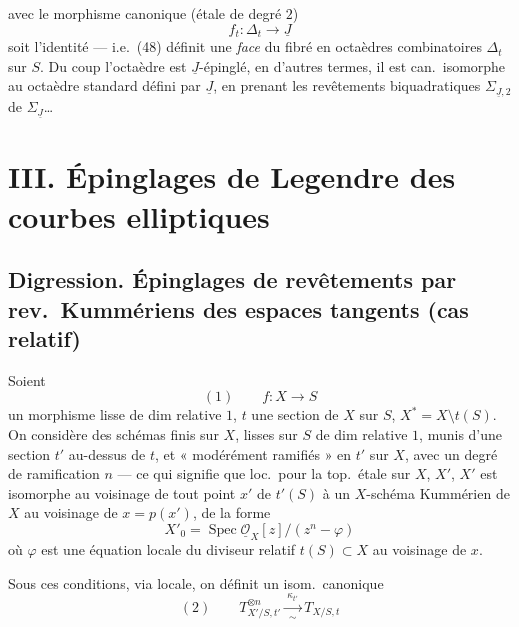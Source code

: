\documentclass[11pt,a4paper]{article}
\begin{document}
avec le morphisme canonique (étale de degré $2$)
\[
  f_t : \Delta_t \longrightarrow \underline{J}
\]
soit l'identité --- i.e.\ (48) définit une \emph{face} du fibré en
octaèdres combinatoires $\Delta_t$ sur $S$. Du coup l'octaèdre est
$\underline{J}$-épinglé, en d'autres termes, il est can.\ isomorphe au
\struck{\ill{}} octaèdre standard défini par $\underline{J}$,  en prenant les revêtements biquadratiques
$\Sigma_{\underline{J},2}$ de $\Sigma_{\underline{J}}$\ldots
{}

\section{III. Épinglages de Legendre des courbes elliptiques}

\subsection{Digression. Épinglages de revêtements par rev.\ Kummériens des espaces tangents (cas relatif)}

Soient
\[
  (1) \qquad f : X \longrightarrow S
\]
un morphisme lisse de dim relative $1$, $t$ une section de $X$ sur $S$,
$X^* = X \setminus t(S)$. On considère des schémas  finis sur
 $X$, lisses sur $S$ de dim relative $1$, munis d'une section
$t'$ au-dessus de $t$, et « modérément ramifiés » en $t'$ sur $X$, avec un
degré de ramification $n$ --- ce qui signifie que loc.\ pour la top.\ étale
sur $X$, $X'$, $X'$ est isomorphe au voisinage de tout point $x'$ de
$t'(S)$  à un $X$-schéma Kummérien de $X$ au voisinage de
$x = p(x')$, de la forme
\[
  X'_0 = \operatorname{Spec} \underline{\mathcal{O}}_X[z]/(z^n - \varphi)
\]
où $\varphi$ est une équation locale du diviseur relatif $t(S) \subset X$ au
voisinage de $x$.

Sous ces conditions, via  locale, on définit un
isom.\ canonique
\[
  (2) \qquad T_{X'/S, t'}^{\otimes n} \xrightarrow[\sim]{\ \kappa_{t'}\ } T_{X/S, t}
\]
\end{document}
